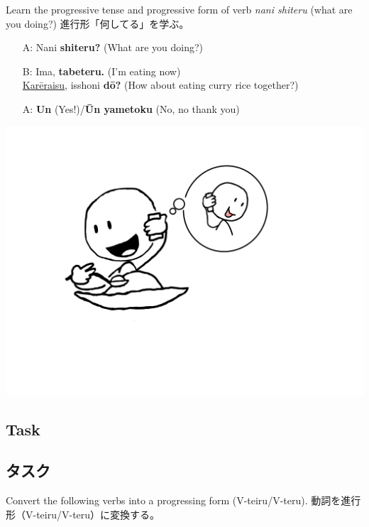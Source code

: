 \documentclass[uplatex,dvipdfmx,b5paper,english,10pt]{jsbook}
\begin{document}
\ifEnglish
Learn the progressive tense and progressive form of verb {\it nani shiteru\/} (what are you doing?)
\else
進行形「何してる」を学ぶ。
\fi

\begin{itemize}
 \item[A:] Nani {\bfseries shiteru?} (What are you doing?)
 \item[B:] Ima, {\bfseries tabeteru.} (I'm eating now)\\
	   \underline{Kar\=eraisu}, isshoni {\bfseries d\=o?} (How about eating curry rice together?)
 \item[A:] {\bfseries Un} (Yes!)/{\bfseries \=Un yametoku} (No, no thank you)
\end{itemize}

\begin{center}
\includegraphics[trim=70 100 120 50, clip, width=.3\hsize]{img/nanishiteru.png}
\end{center}

\ifEnglish
\subsection{Task}
\else
\subsection{タスク}
\fi

\begin{toiquestion}
\ifEnglish
Convert the following verbs into a progressing form (V-teiru/V-teru).
\else
動詞を進行形（V-teiru/V-teru）に変換する。
\fi
\end{toiquestion}
\end{document}
